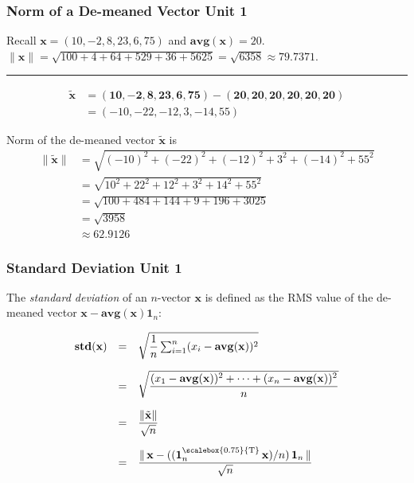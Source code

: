 \documentclass[12pt]{beamer}
\newcommand{\FrameTitle}[2]{\frametitle{#1 \hfill \small\textnormal{\textcolor{midgray}{#2}}}}
\newcommand{\MVec}[1]{\mathbf{#1}}
\newcommand{\Norm}[1]{\lVert {{#1}} \rVert}
\newcommand{\Trans}{\text{\raisebox{0.5ex}{\scalebox{0.75}{T}}}}
\newcommand{\Avg}[1]{\mathbf{avg}{(\MVec{#1})}}
\newcommand{\Std}[1]{\mathbf{std}(\MVec{#1})}
\begin{document}
\begin{frame}\FrameTitle{Norm of a De-meaned Vector}{Unit 1}
    Recall $\MVec{x} = (10, -2, 8, 23, 6, 75)$ and $\Avg{x} = 20$. \vspace*{4pt}\\
    $\Norm{\MVec{x}} = \sqrt{100+4+64+529+36+5625} = \sqrt{6358} \approx 79.7371$.\vspace*{8pt}\\

    \noindent\rule{\textwidth}{0.4pt}
    \begin{align*}
    \tilde{\MVec{x}} &= \MVec{(10, -2, 8, 23, 6, 75)} - \MVec{(20, 20, 20, 20, 20, 20)}\\[2pt]
                            &= (-10, -22, -12, 3, -14, 55)
    \end{align*}

    Norm of the de-meaned vector $\tilde{\MVec{x}}$ is
    \begin{align*}
        \Norm{\tilde{\MVec{x}}} &= \sqrt{(-10)^2 + (-22)^2 + (-12)^2 + 3^2 + (-14)^2 + 55^2} \\[2pt]
                        &= \sqrt{10^2 + 22^2 + 12^2 + 3^2 + 14^2 + 55^2}\\[2pt]
                        &= \sqrt{100 + 484 + 144 + 9 + 196 + 3025} \\[2pt]
                        &= \sqrt{3958} \\[2pt]
                        &\approx 62.9126
    \end{align*}
\end{frame}

\begin{frame}\FrameTitle{Standard Deviation}{Unit 1}
    The \emph{standard deviation} of an $n$-vector $\MVec{x}$
    is defined as the RMS value of the de-meaned vector $\MVec{x} - \Avg{x}\MVec{1}_n$:

    \[
        \begin{array}{rll}
            \Std{\MVec{x}} &=& \sqrt{\dfrac{1}{n}\sum_{i=1}^{n} (x_i - \Avg{x})^2} \\[1.5em]
            &=& \sqrt{\dfrac{(x_1-\Avg{x})^2 + \cdots + (x_n-\Avg{x})^2}{n}} \\[1.5em]
            &=& \dfrac{\Norm{\tilde{\MVec{x}}}}{\sqrt{n}} \\[1.5em]
            &=& \dfrac{\lVert\,\MVec{x} - ((\MVec{1}_n^{\Trans}\,\MVec{x})/{n}) \, \MVec{1}_n \,\rVert}{\sqrt{n}}
        \end{array}
    \]
\end{frame}
\end{document}
